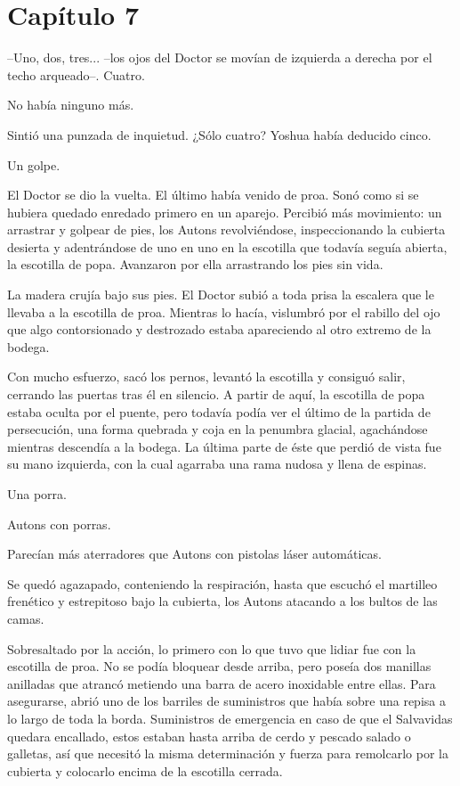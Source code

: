 \chapter*{Capítulo 7}

--Uno, dos, tres... --los ojos del Doctor se movían de izquierda a derecha por el techo arqueado--. Cuatro.
 
No había ninguno más.
 
Sintió una punzada de inquietud. ¿Sólo cuatro? Yoshua había deducido cinco.
 
Un golpe.
 
El Doctor se dio la vuelta. El último había venido de proa. Sonó como si se hubiera quedado enredado primero en un aparejo. Percibió más movimiento: un arrastrar y golpear de pies, los Autons revolviéndose, inspeccionando la cubierta desierta y adentrándose de uno en uno en la escotilla que todavía seguía abierta, la escotilla de popa. Avanzaron por ella arrastrando los pies sin vida.
 
La madera crujía bajo sus pies. El Doctor subió a toda prisa la escalera que le llevaba a la escotilla de proa. Mientras lo hacía, vislumbró por el rabillo del ojo que algo contorsionado y destrozado estaba apareciendo al otro extremo de la bodega.
 
Con mucho esfuerzo, sacó los pernos, levantó la escotilla y consiguó salir, cerrando las puertas tras él en silencio. A partir de aquí, la escotilla de popa estaba oculta por el puente, pero todavía podía ver el último de la partida de persecución, una forma quebrada y coja en la penumbra glacial, agachándose mientras descendía a la bodega. La última parte de éste que perdió de vista fue su mano izquierda, con la cual agarraba una rama nudosa y llena de espinas.
 
Una porra.
 
Autons con porras.
 
Parecían más aterradores que Autons con pistolas láser automáticas.
 
Se quedó agazapado, conteniendo la respiración, hasta que escuchó el martilleo frenético y estrepitoso bajo la cubierta, los Autons atacando a los bultos de las camas.
 
Sobresaltado por la acción, lo primero con lo que tuvo que lidiar fue con la escotilla de proa. No se podía bloquear desde arriba, pero poseía dos manillas anilladas que atrancó metiendo una barra de acero inoxidable entre ellas. Para asegurarse, abrió uno de los barriles de suministros que había sobre una repisa a lo largo de toda la borda. Suministros de emergencia en caso de que el Salvavidas quedara encallado, estos estaban hasta arriba de cerdo y pescado salado o galletas, así que necesitó la misma determinación y fuerza para remolcarlo por la cubierta y colocarlo encima de la escotilla cerrada.
 
